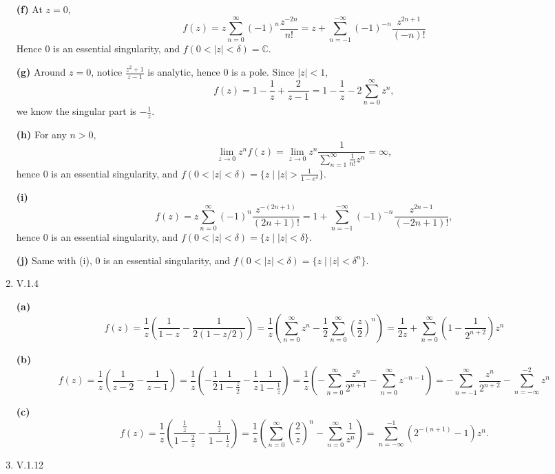 \documentclass{article}%
\begin{document}
\begin{enumerate}
\textbf{(f)} At $z = 0$, 
$$
f(z) = z\sum_{n=0}^{\infty}(-1)^n\frac{z^{-2n}}{n!} = z+\sum_{n=-1}^{-\infty} (-1)^{-n}\frac{z^{2n+1}}{(-n)!}
$$
Hence $0$ is an essential singularity, and $f(0<|z|<\delta) = \mathbb{C}$.

\textbf{(g)} Around $z = 0$, notice $\frac{z^2+1}{z-1}$ is analytic, hence $0$ is a pole. Since $|z| < 1$,
$$
f(z) = 1-\frac{1}{z}+\frac{2}{z-1} = 1-\frac{1}{z}-2\sum_{n=0}^{\infty}z^n,
$$
we know the singular part is $-\frac{1}{z}$.

\textbf{(h)} For any $n > 0$, 
$$
\lim_{z\to 0}z^nf(z) = \lim_{z\to 0}z^n\frac{1}{\sum_{n=1}^{\infty}\frac{1}{n!}z^n} = \infty,
$$
hence $0$ is an essential singularity, and $f(0<|z|<\delta) = \{z\mid |z| > \frac{1}{1-e^{\delta}}\} $.

\textbf{(i)} 
$$
f(z) = z\sum_{n=0}^{\infty}(-1)^n\frac{z^{-(2n+1)}}{(2n+1)!} = 1+\sum_{n=-1}^{-\infty}(-1)^{-n}\frac{z^{2n-1}}{(-2n+1)!},
$$
hence $0$ is an essential singularity, and $f(0<|z|<\delta) = \{z\mid |z| < \delta\} $.

\textbf{(j)} Same with (i), 0 is an essential singularity, and $f(0<|z|<\delta) = \{z\mid |z| < \delta^n\}$.

\item V.1.4

\textbf{(a)} 
$$
f(z) = \frac{1}{z}(\frac{1}{1-z}-\frac{1}{2(1-z/2)}) = \frac{1}{z}(\sum_{n=0}^{\infty}z^n-\frac{1}{2}\sum_{n=0}^{\infty}(\frac{z}{2})^n) = \frac{1}{2z} + \sum_{n=0}^{\infty}(1-\frac{1}{2^{n+2}})z^n
$$

\textbf{(b)} 
$$
f(z) = \frac{1}{z}(\frac{1}{z-2}-\frac{1}{z-1}) = \frac{1}{z}(-\frac{1}{2}\frac{1}{1-\frac{z}{2}} - \frac{1}{z}\frac{1}{1-\frac{1}{z}}) = \frac{1}{z}(-\sum_{n=0}^{\infty}\frac{z^n}{2^{n+1}} -\sum_{n=0}^{\infty}z^{-n-1}) = -\sum_{n=-1}^{\infty}\frac{z^n}{2^{n+2}}-\sum_{n=-\infty}^{-2}z^n
$$

\textbf{(c)}
$$
f(z) = \frac{1}{z}(\frac{\frac{1}{z}}{1-\frac{2}{z}}-\frac{\frac{1}{z}}{1-\frac{1}{z}}) = \frac{1}{z}(\sum_{n=0}^{\infty}(\frac{2}{z})^n-\sum_{n=0}^{\infty}\frac{1}{z^n}) = \sum_{n=-\infty}^{-1}(2^{-(n+1)}-1)z^n.
$$

\item V.1.12


\end{enumerate}
\end{document}
